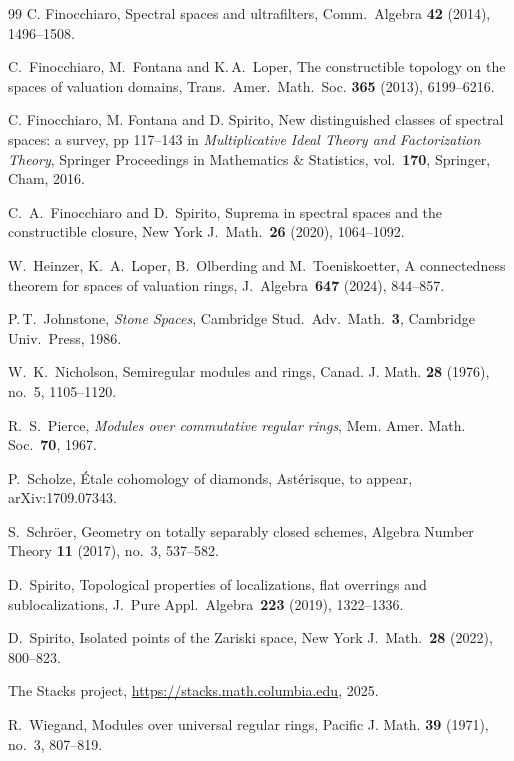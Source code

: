 \documentclass[11pt]{amsart}
\begin{document}
\begin{thebibliography}{99}
 C. Finocchiaro, Spectral spaces and ultrafilters, Comm.~Algebra  \textbf{42} (2014), 1496--1508.

 C.~Finocchiaro, M.~Fontana and K.\,A.~Loper, The constructible topology on the spaces of valuation domains, Trans.~Amer.~Math.~Soc. {\bf 365} (2013), 6199--6216.

C. Finocchiaro, M. Fontana and D. Spirito, New distinguished classes of spectral spaces: a
survey, pp 117--143 in {\it Multiplicative Ideal Theory and Factorization Theory}, Springer Proceedings in Mathematics \& Statistics, vol.~\textbf{170}, Springer, Cham, 2016.

 C.~A.~Finocchiaro and D.~Spirito, Suprema in spectral spaces and the constructible closure, New York J.~Math.~\textbf{26} (2020), 1064--1092.

 W.~Heinzer, K.~A.~Loper, B.~Olberding and M.~Toeniskoetter, A connectedness theorem for spaces of valuation rings, J.~Algebra~\textbf{647} (2024), 844--857.

 P.\,T.~Johnstone, {\it Stone Spaces}, Cambridge Stud.~Adv.~Math.~\textbf{3}, Cambridge Univ.~Press, 1986.

W.~K.~Nicholson,
{Semiregular modules and rings},
Canad. J. Math. \textbf{28} (1976), no.~5, 1105--1120.

 R.~S.~Pierce, {\it Modules over commutative regular rings}, Mem. Amer. Math. Soc.~\textbf{70}, 1967.


P.~Scholze, {\'Etale cohomology of diamonds}, Ast\'erisque, to appear, arXiv:1709.07343.

S.~Schr\"oer,
{Geometry on totally separably closed schemes},
Algebra Number Theory \textbf{11} (2017), no.~3, 537--582.

 D.~Spirito, Topological properties of localizations, flat overrings and sublocalizations, J.~Pure Appl.~Algebra~\textbf{223} (2019), 1322--1336.

 D.~Spirito, Isolated points of the Zariski space, New York J.~Math.~\textbf{28} (2022), 800--823.

 The Stacks project, {\url{https://stacks.math.columbia.edu}},
 2025.

R.~Wiegand,
Modules over universal regular rings,
Pacific J. Math. \textbf{39} (1971), no.~3, 807--819.

\end{thebibliography}
\end{document}

